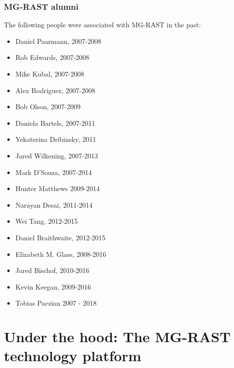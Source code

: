 \documentclass[letterpaper,10pt,english]{sphinxmanual}
\begin{document}
\subsection{MG-RAST alumni}
\label{\detokenize{user_manual:mg-rast-alumni}}
The following people were associated with MG-RAST in the past:
\begin{itemize}
\item {} 
Daniel Paarmann, 2007-2008

\item {} 
Rob Edwards, 2007-2008

\item {} 
Mike Kubal, 2007-2008

\item {} 
Alex Rodriguez, 2007-2008

\item {} 
Bob Olson, 2007-2009

\item {} 
Daniela Bartels, 2007-2011

\item {} 
Yekaterina Dribinsky, 2011

\item {} 
Jared Wilkening, 2007-2013

\item {} 
Mark D’Souza, 2007-2014

\item {} 
Hunter Matthews 2009-2014

\item {} 
Narayan Desai, 2011-2014

\item {} 
Wei Tang, 2012-2015

\item {} 
Daniel Braithwaite, 2012-2015

\item {} 
Elizabeth M. Glass, 2008-2016

\item {} 
Jared Bischof, 2010-2016

\item {} 
Kevin Keegan, 2009-2016

\item {} 
Tobias Paczian 2007 - 2018

\end{itemize}


\chapter{Under the hood: The MG-RAST technology platform}
\label{\detokenize{user_manual:under-the-hood-the-mg-rast-technology-platform}}
\end{document}
